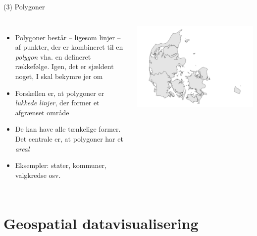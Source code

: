 \documentclass[
  8pt,
  ignorenonframetext,
  aspectratio=169]{beamer}
\newcommand{\columnsbegin}{\begin{columns}}
\newcommand{\columnsend}{\end{columns}}
\begin{document}
\begin{frame}{(3) Polygoner}
\protect\hypertarget{polygoner}{}
\columnsbegin
{}

\begin{itemize}
\item
  Polygoner består -- ligesom linjer -- af punkter, der er kombineret
  til en \emph{polygon} vha. en defineret rækkefølge. Igen, det er
  sjældent noget, I skal bekymre jer om
\item
  Forskellen er, at polygoner er \emph{lukkede linjer}, der former et
  afgrænset område
\item
  De kan have alle tænkelige former. Det centrale er, at polygoner har
  et \emph{areal}
\item
  Eksempler: stater, kommuner, valgkredse osv.
\end{itemize}


\tiny

\includegraphics[width=1\linewidth]{crashcourse_slides_files/figure-beamer/unnamed-chunk-12-1}

\normalsize

\columnsend
\end{frame}

\hypertarget{geospatial-datavisualisering}{%
\section{Geospatial
datavisualisering}\label{geospatial-datavisualisering}}
\end{document}
